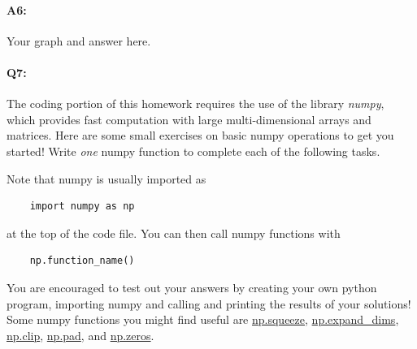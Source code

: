 \pagebreak
\paragraph{A6:} Your graph and answer here.





\pagebreak
\paragraph{Q7:} The coding portion of this homework requires the use of the library \emph{numpy}, which provides fast computation with large multi-dimensional arrays and matrices. Here are some small exercises on basic numpy operations to get you started! Write \emph{one} numpy function to complete each of the following tasks.

Note that numpy is usually imported as
\begin{verbatim}
    import numpy as np
\end{verbatim}
at the top of the code file. You can then call numpy functions with \begin{verbatim}
    np.function_name()
\end{verbatim}
You are encouraged to test out your answers by creating your own python program, importing numpy and calling and printing the results of your solutions! Some numpy functions you might find useful are \href{https://numpy.org/doc/stable/reference/generated/numpy.squeeze.html}{np.squeeze}, \href{https://numpy.org/doc/stable/reference/generated/numpy.expand_dims.html}{np.expand\_dims}, \href{https://numpy.org/doc/stable/reference/generated/numpy.clip.html}{np.clip}, \href{https://numpy.org/doc/stable/reference/generated/numpy.pad.html}{np.pad}, and \href{https://numpy.org/doc/stable/reference/generated/numpy.zeros.html}{np.zeros}.

